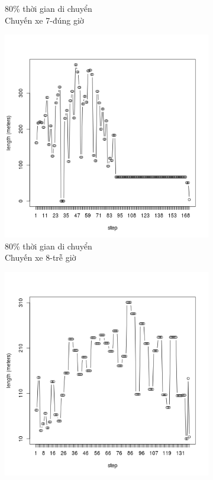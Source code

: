\documentclass[a4paper, 13pt]{report}
\begin{document}
\begin{figure}
\begin{subfigure}[b]{0.25\textwidth}
                \caption*{80\% thời gian di chuyển\\Chuyến xe 7-đúng giờ}
        \end{subfigure}%
        \begin{subfigure}[b]{0.25\textwidth}
                \includegraphics[width=\linewidth]{test8}
                \caption*{80\% thời gian di chuyển\\Chuyến xe 8-trễ giờ}
        \end{subfigure}
        \begin{subfigure}[b]{0.25\textwidth}
                \includegraphics[width=\linewidth]{test9}

\end{subfigure}
\end{figure}
\end{document}
